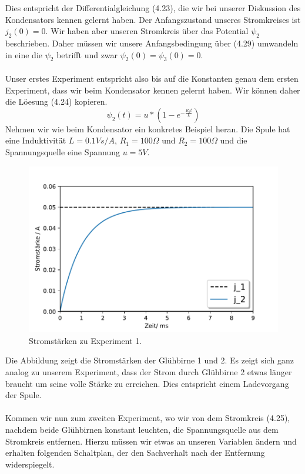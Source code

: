 \documentclass[11pt,a4paper,leqno]{report}
\numberwithin{equation}{chapter}
\begin{document}
Dies entspricht der Differentialgleichung (4.23), die wir bei unserer Diskussion des Kondensators kennen gelernt haben. Der Anfangszustand unseres Stromkreises ist $j_2(0) = 0$. Wir haben aber unseren Stromkreis \"uber das Potential $\psi_2$ beschrieben.  Daher m\"ussen wir unsere Anfangsbedingung \"uber (4.29)  umwandeln in eine die $\psi_2$ betrifft und zwar $\psi_2(0) = \psi_3(0) = 0$.\\
\\
Unser erstes Experiment entspricht also bis auf die Konstanten genau dem ersten Experiment, dass wir beim Kondensator kennen gelernt haben. Wir k\"onnen daher die L\"oesung (4.24) kopieren.
\begin{equation}
\psi_2(t) = u * (1 - e^{-\frac{R_2 t}{L}})
\end{equation}  
Nehmen wir wie beim Kondensator ein konkretes Beispiel heran. Die Spule hat eine Induktivit\"at $L=0.1 Vs/A$, $R_1=100\Omega$ und $R_2=100\Omega$ und die Spannungsquelle eine Spannung $u=5V$.
\begin{figure}[H]
	\begin{center}
		\includegraphics[scale=0.75]{Bilder/spule_j.pdf}
		\caption{Stromst\"arken zu Experiment 1.}
	\end{center}
\end{figure}
\noindent
Die Abbildung zeigt die Stromst\"arken der Gl\"uhbirne 1 und 2. Es zeigt sich ganz analog zu unserem Experiment, dass der Strom durch Gl\"uhbirne 2 etwas l\"anger braucht um seine volle St\"arke zu erreichen. Dies entspricht einem Ladevorgang der Spule.\\
\\
Kommen wir nun zum zweiten Experiment, wo wir von dem Stromkreis (4.25), nachdem beide Gl\"uhbirnen konstant leuchten, die Spannungsquelle aus dem Stromkreis entfernen. Hierzu m\"ussen wir etwas an unseren Variablen \"andern und erhalten folgenden Schaltplan, der den Sachverhalt nach der Entfernung widerspiegelt.
\end{document}
